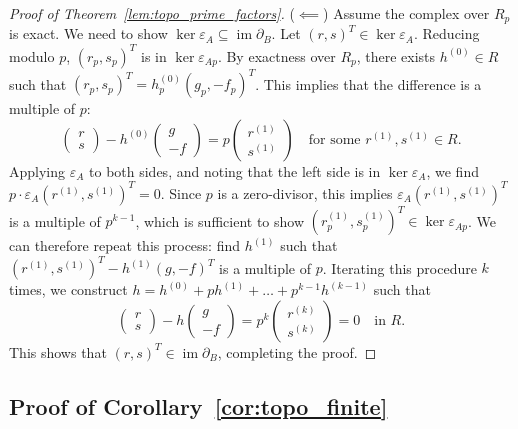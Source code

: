 \documentclass[aps,prb,english,superscriptaddress,twocolumn,tightenlines,showpacs,longbibliography,floatfix,amsfonts]{revtex4-2}
\begin{document}
\begin{proof}[Proof of Theorem~\ref{lem:topo_prime_factors}]
($\impliedby$) Assume the complex over $R_p$ is exact. We need to show $\ker\varepsilon_A \subseteq \operatorname{im}\partial_B$. Let $(r,s)^T \in \ker\varepsilon_A$. Reducing modulo $p$, $(r_p, s_p)^T$ is in $\ker\varepsilon_{Ap}$. By exactness over $R_p$, there exists $h^{(0)} \in R$ such that $(r_p, s_p)^T = h^{(0)}_p(g_p, -f_p)^T$. This implies that the difference is a multiple of $p$:
\begin{equation}
    \begin{pmatrix} r \\ s \end{pmatrix} - h^{(0)}\begin{pmatrix} g \\ -f \end{pmatrix} = p \begin{pmatrix} r^{(1)} \\ s^{(1)} \end{pmatrix} \quad \text{for some } r^{(1)}, s^{(1)} \in R. \label{eq:relation_topo_3}
\end{equation}
Applying $\varepsilon_A$ to both sides, and noting that the left side is in $\ker\varepsilon_A$, we find $p \cdot \varepsilon_A (r^{(1)}, s^{(1)})^T = 0$. Since $p$ is a zero-divisor, this implies $\varepsilon_A (r^{(1)}, s^{(1)})^T$ is a multiple of $p^{k-1}$, which is sufficient to show $(r^{(1)}_p, s^{(1)}_p)^T \in \ker\varepsilon_{Ap}$.
We can therefore repeat this process: find $h^{(1)}$ such that $(r^{(1)}, s^{(1)})^T - h^{(1)}(g, -f)^T$ is a multiple of $p$. Iterating this procedure $k$ times, we construct $h = h^{(0)} + p h^{(1)} + \dots + p^{k-1}h^{(k-1)}$ such that
\begin{equation}
    \begin{pmatrix} r \\ s \end{pmatrix} - h \begin{pmatrix} g \\ -f \end{pmatrix} = p^k \begin{pmatrix} r^{(k)} \\ s^{(k)} \end{pmatrix} = 0 \quad \text{in } R.
\end{equation}
This shows that $(r,s)^T \in \operatorname{im}\partial_B$, completing the proof.
\end{proof}

\subsection{Proof of Corollary~\ref{cor:topo_finite}}
\end{document}
